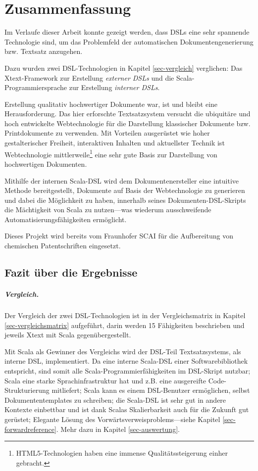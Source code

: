 \chapter{Zusammenfassung}

Im Verlaufe dieser Arbeit konnte gezeigt werden, dass DSLs eine sehr
spannende Technologie sind, um das Problemfeld der automatischen
Dokumentengenerierung bzw. Textsatz anzugehen. %

Dazu wurden zwei DSL-Technologien in Kapitel \ref{sec-vergleich} verglichen:
Das Xtext-Framework zur Erstellung \emph{externer DSLs} und
die Scala-Programmiersprache zur Erstellung \emph{interner DSLs}.

Erstellung qualitativ hochwertiger Dokumente war,
ist und bleibt eine Herausforderung.
Das hier erforschte Textsatzsystem versucht die ubiquitäre und hoch entwickelte
Webtechnologie für die Darstellung klassischer Dokumente bzw. Printdokumente
zu verwenden.
Mit Vorteilen ausgerüstet wie hoher gestalterischer Freiheit,
interaktiven Inhalten und aktuellster Technik ist Webtechnologie
mittlerweile\footnote{
HTML5-Technologien haben eine immense Qualitätssteigerung einher gebracht.}
eine sehr gute Basis zur Darstellung von hochwertigen Dokumenten.

Mithilfe der internen Scala-DSL wird dem Dokumentenersteller eine intuitive
Methode bereitgestellt, Dokumente auf Basis der Webtechnologie zu generieren
und dabei die Möglichkeit zu haben, innerhalb seines Dokumenten-DSL-Skripts
die Mächtigkeit von Scala zu nutzen---was wiederum ausschweifende
Automatisierungsfähigkeiten ermöglicht.

Dieses Projekt wird bereits vom Fraunhofer SCAI für die Aufbereitung von
chemischen Patentschriften eingesetzt.

\section{Fazit über die Ergebnisse}

\paragraph{Vergleich.}
Der Vergleich der zwei DSL-Technologien ist
in der Vergleichsmatrix in Kapitel \ref{sec-vergleichsmatrix} aufgeführt,
darin werden 15 Fähigkeiten beschrieben und jeweils Xtext mit Scala
gegenübergestellt.

Mit Scala als Gewinner des Vergleichs wird der DSL-Teil Textsatzsystems, als
interne DSL, implementiert. Da eine interne Scala-DSL einer Softwarebibliothek
entspricht, sind somit alle Scala-Programmierfähigkeiten im DSL-Skript nutzbar;
Scala eine starke Sprachinfrastruktur hat und z.B. eine
ausgereifte Code-Strukturierung
mitliefert; Scala kann es einem DSL-Benutzer ermöglichen, selbst Dokumententemplates
zu schreiben; die Scala-DSL ist sehr gut in andere Kontexte einbettbar und ist
dank Scalas Skalierbarkeit auch für die Zukunft gut gerüstet; Elegante Lösung
des Vorwärtsverweisproblems---siehe Kapitel \ref{sec-forwardreference}.
Mehr dazu in Kapitel \ref{sec-auswertung}.

